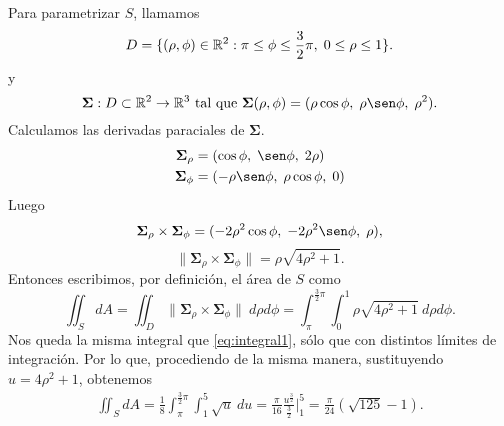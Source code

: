 \begin{solution}
    Para parametrizar $S$, llamamos
    \[
        D = \{(\rho, \phi)\in\mathbb{R}^2 : \pi\leq\phi\leq\frac{3}{2}\pi,\;
        0\leq\rho\leq 1\}.
    \]
    y
    \[
        \boldsymbol{\Sigma}:D\subset\Rn{2}\rightarrow\Rn{3}\text{ tal que }
        \boldsymbol{\Sigma}(\rho,\phi)=(\rho\cos\phi,\;\rho\sen\phi,\;\rho^2).
    \]
    Calculamos las derivadas paraciales de $\boldsymbol{\Sigma}$.
    \begin{align*}
        \boldsymbol{\Sigma}_{\rho}&=(\cos \phi,\;\sen \phi,\; 2\rho)\\
        \boldsymbol{\Sigma}_\phi&=(  -\rho \sen \phi,\;\rho \cos \phi,\;0)
        \end{align*}
    Luego
    $$
        \boldsymbol{\Sigma}_{\rho} \times\boldsymbol{\Sigma}_\phi =
        (-2\rho^2 \cos\phi  , \;-2\rho^2 \sen \phi, \;\rho),
    $$ 
    $$\|\boldsymbol{\Sigma}_{\rho} \times\boldsymbol{\Sigma}_\phi\|
        = \rho\sqrt{4\rho^2+1}.
    $$ 
    Entonces escribimos, por definici\'on, el \'area de $S$ como
    \[
        \iint_S dA = \iint_D \| \boldsymbol{\Sigma}_{\rho}
        \times\boldsymbol{\Sigma}_\phi\|\:d\rho d\phi = \int_\pi^{\frac{3}{2}\pi}\int_0^1\rho\sqrt{4\rho^2+1}\:d\rho d\phi.
    \]
    Nos queda la misma integral que \eqref{eq:integral1}, s\'olo que con distintos l\'imites de integraci\'on. Por lo que, procediendo de la misma manera, sustituyendo $u = 4\rho^2+1$, obtenemos
    \begin{gather*}
        \iint_S dA =
        \frac{1}{8}\int_\pi^{\frac{3}{2}\pi}\int_1^5\sqrt{u}\:du =
        \frac{\pi}{16}\frac{u^{\frac{3}{2}}}{\frac{3}{2}}\Bigg\lvert_1^5 =
        \frac{\pi}{24}(\sqrt{125}-1).
    \end{gather*}
\end{solution}


